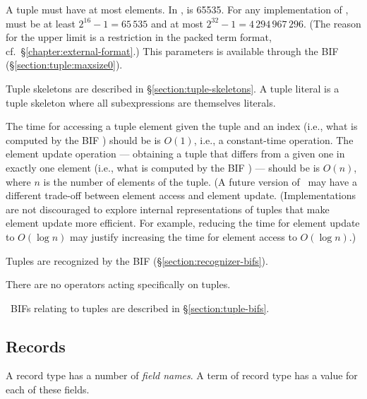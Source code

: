 A tuple must have at most  elements.
\ifOld
In \OldErlang,  is 65535.
\fi
\ifStd
For any implementation of \StdErlang,
 must be at least $2^{16}-1 = 65\,535$ and at most
$2^{32}-1 = 4\,294\,967\,296$.
(The reason for the upper limit is a restriction in the packed term format,
cf.~\S\ref{chapter:external-format}.)
This parameters is available through the BIF
 (\S\ref{section:tuple:maxsize0}).
\fi
{}

Tuple skeletons are described in \S\ref{section:tuple-skeletons}.
A tuple literal is a tuple skeleton where all subexpressions are
themselves literals.

The time for accessing a tuple element given the tuple and an index
(i.e., what is computed by the BIF )
\ifStd should be \else is \fi
$O(1)$, i.e., a constant-time operation.  The element update operation
--- obtaining a tuple that differs from a given one in exactly one
element (i.e., what is computed by the BIF
) ---
\ifStd should be \else is \fi
$O(n)$, where $n$ is the number of elements of the tuple.
\ifOld
(A future version of \Erlang\ may have a different trade-off between
element access and element update.
\fi
\ifStd
(Implementations are not discouraged to explore internal
representations of tuples that make element update more efficient.
\fi
For example, reducing the time for element update to
$O(\log n)$ may justify increasing the time for element access to
$O(\log n)$.)

Tuples are recognized by the BIF \ifStd{}\else{}\fi
(\S\ref{section:recognizer-bifs}).

There are no operators acting specifically on tuples.

\Erlang\ BIFs relating to tuples are described in \S\ref{section:tuple-bifs}.

\subsection{Records}

\label{section:records}

A record type  has a number of \emph{field names}.  A term of record
type  has a value for each of these fields.

